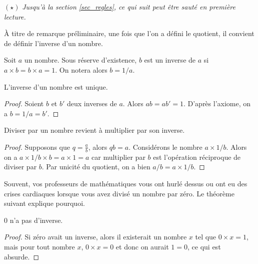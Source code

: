 		$(\star)$ \emph{Jusqu'à la section \ref{sec_regles}, ce qui suit peut être sauté en première lecture.}

		À titre de remarque préliminaire, une fois que l'on a défini le quotient, il convient de définir l'inverse d'un nombre.
		\begin{defi}
			Soit $a$ un nombre. Sous réserve d'existence, $b$ est un inverse de $a$ si $a\times b=b\times a=1$. On notera alors $b=1/a$.
		\end{defi}
		\begin{thm}
			L'inverse d'un nombre est unique.
		\end{thm}
		\begin{proof}
			Soient $b$ et $b'$ deux inverses de $a$. Alors $ab=ab'=1$. D'après l'axiome, on a $b=1/a=b'$.
		\end{proof}
		\begin{cor}
			Diviser par un nombre revient à multiplier par son inverse.
		\end{cor}
		\begin{proof}
			Supposons que $q=\frac{a}{b}$, alors $qb=a$. Considérons le nombre $a\times1/b$. Alors on a $a\times 1/b\times b=a\times 1 =a$ car multiplier par $b$ est l'opération réciproque de diviser par $b$. Par unicité du quotient, on a bien $a/b=a\times 1/b$.
		\end{proof}

		Souvent, vos professeurs de mathématiques vous ont hurlé dessus ou ont eu des crises cardiaques lorsque vous avez divisé un nombre par zéro. Le théorème suivant explique pourquoi.
		\begin{thm}
			0 n'a pas d'inverse.
		\end{thm}
		\begin{proof}
			Si zéro avait un inverse, alors il existerait un nombre $x$ tel que $0\times x=1$, mais pour tout nombre $x$, $0\times x=0$ et donc on aurait $1=0$, ce qui est absurde.
		\end{proof}


